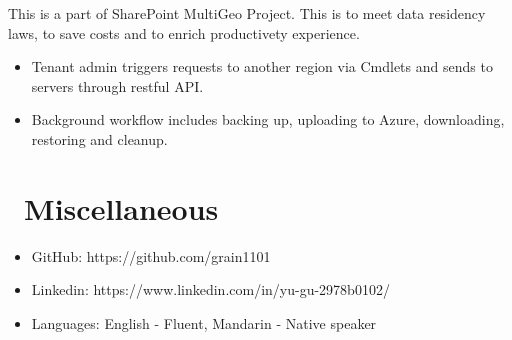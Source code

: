 \documentclass{resume}
\begin{document}
 { }
This is a part of SharePoint MultiGeo Project. This is to meet data residency laws,
to save costs and to enrich productivety experience.
\begin{itemize}
  \item Tenant admin triggers requests to another region via Cmdlets and sends to servers through restful API.
  \item Background workflow includes backing up, uploading to Azure, downloading, restoring and cleanup.
\end{itemize}



\section{\faInfo\ Miscellaneous}
\begin{itemize}[parsep=0.5ex]
  \item GitHub: https://github.com/grain1101
  \item Linkedin: https://www.linkedin.com/in/yu-gu-2978b0102/
  \item Languages: English - Fluent, Mandarin - Native speaker
\end{itemize}

%
%
\end{document}
